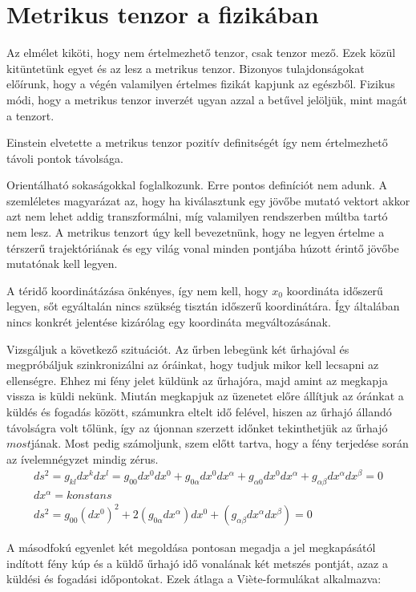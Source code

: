 \documentclass[a4paper,12pt]{article}
\begin{document}
\section{ Metrikus tenzor a fizikában}
\par Az elmélet kiköti, hogy nem értelmezhető tenzor, csak tenzor mező. Ezek közül kitüntetünk egyet és az lesz a metrikus tenzor. Bizonyos tulajdonságokat előírunk, hogy a végén valamilyen értelmes fizikát kapjunk az egészből. Fizikus módi, hogy a metrikus tenzor inverzét ugyan azzal a betűvel jelöljük, mint magát a tenzort. 
\par Einstein elvetette a metrikus tenzor pozitív definitségét így nem értelmezhető távoli pontok távolsága. 
\par Orientálható sokaságokkal foglalkozunk. Erre pontos definíciót nem adunk. A szemléletes magyarázat az, hogy ha kiválasztunk egy jövőbe mutató vektort akkor azt nem lehet addig transzformálni, míg valamilyen rendszerben múltba tartó nem lesz. A metrikus tenzort úgy kell bevezetnünk, hogy ne legyen értelme a térszerű trajektóriának és egy világ vonal minden pontjába húzott érintő  jövőbe mutatónak kell legyen. 
\par A téridő koordinátázása önkényes, így nem kell, hogy $x_0$ koordináta időszerű legyen, sőt egyáltalán nincs szükség tisztán időszerű koordinátára. Így általában nincs konkrét jelentése kizárólag egy koordináta megváltozásának.
\par Vizsgáljuk a következő szituációt. Az űrben lebegünk két űrhajóval és megpróbáljuk szinkronizálni az óráinkat, hogy tudjuk mikor kell lecsapni az ellenségre. Ehhez mi fény jelet küldünk az űrhajóra, majd amint az megkapja vissza is küldi nekünk. Miután megkapjuk az üzenetet előre állítjuk az óránkat a küldés és fogadás között, számunkra eltelt idő felével, hiszen az űrhajó állandó távolságra volt tőlünk, így az újonnan szerzett időnket tekinthetjük az űrhajó $most$jának. Most pedig számoljunk, szem előtt tartva, hogy a fény terjedése során az ívelemnégyzet mindig zérus.
\begin{gather*}
    ds^{2} = g_{kl}dx^{k}dx^{l} = g_{00}dx^{0}dx^{0} + g_{0\alpha}dx^{0}dx^{\alpha} + g_{\alpha 0}dx^{0}dx^{\alpha} +
    g_{\alpha\beta}dx^{\alpha}dx^{\beta} = 0 \\
    dx^{\alpha} = konstans \\
    ds^{2} = g_{00}(dx^{0})^{2} + 2(g_{0\alpha}dx^{\alpha})dx^{0} + (g_{\alpha\beta} dx^{\alpha}dx^{\beta}) = 0
\end{gather*}
\par A másodfokú egyenlet két megoldása pontosan megadja a jel megkapásától indított fény kúp és a küldő űrhajó idő vonalának két metszés pontját, azaz a küldési és fogadási időpontokat. Ezek átlaga a Vi\`ete-formulákat alkalmazva:
\end{document}

